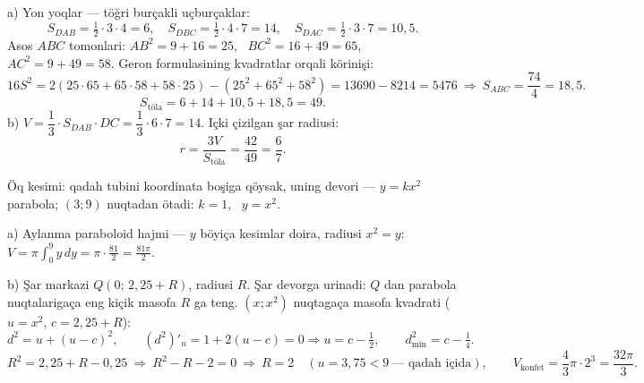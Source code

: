 a) Yon yoqlar — töğri burçakli uçburçaklar:
\[S_{DAB}=\tfrac12\cdot3\cdot4=6,\quad S_{DBC}=\tfrac12\cdot4\cdot7=14,\quad S_{DAC}=\tfrac12\cdot3\cdot7=10{,}5.\]
Asos $ABC$ tomonlari: $AB^2=9+16=25$, \ $BC^2=16+49=65$, \ $AC^2=9+49=58$. Geron formulasining kvadratlar orqali körinişi:
\[16S^2=2(25\cdot65+65\cdot58+58\cdot25)-(25^2+65^2+58^2)=13690-8214=5476\ \Rightarrow\ S_{ABC}=\frac{74}4=18{,}5.\]
\[S_{\text{töla}}=6+14+10{,}5+18{,}5=49.\]
b) $V=\dfrac13\cdot S_{DAB}\cdot DC=\dfrac13\cdot6\cdot7=14$. Içki çizilgan şar radiusi:
\[r=\frac{3V}{S_{\text{töla}}}=\frac{42}{49}=\frac67.\]

\newpage
{}
Öq kesimi: qadah tubini koordinata boşiga qöysak, uning devori — $y=kx^2$ parabola; $(3;9)$ nuqtadan ötadi: $k=1$, \ $y=x^2$.

a) Aylanma paraboloid hajmi — $y$ böyiça kesimlar doira, radiusi $x^2=y$:
$V=\pi\displaystyle\int_0^9y\,dy=\pi\cdot\frac{81}2=\frac{81\pi}2.$

b) Şar markazi $Q(0;\,2{,}25+R)$, radiusi $R$. Şar devorga urinadi: $Q$ dan parabola nuqtalarigaça eng kiçik masofa $R$ ga teng. $(x;x^2)$ nuqtagaça masofa kvadrati ($u=x^2$, $c=2{,}25+R$):
\[d^2=u+(u-c)^2,\qquad (d^2)'_u=1+2(u-c)=0\Rightarrow u=c-\tfrac12,\qquad d^2_{\min}=c-\tfrac14.\]
\[R^2=2{,}25+R-0{,}25\ \Rightarrow\ R^2-R-2=0\ \Rightarrow\ R=2\quad(u=3{,}75<9\ \text{— qadah içida}),\qquad V_{\text{konfet}}=\frac43\pi\cdot2^3=\frac{32\pi}3.\]

\ShowJavoblar

